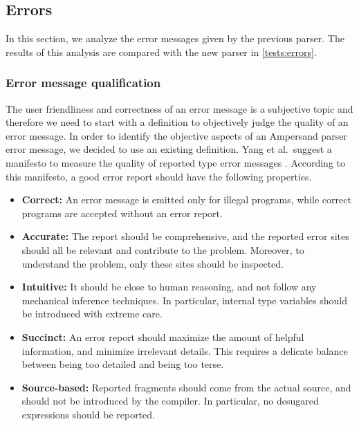 
\subsection{Errors}
\label{analysis:errors}
In this section, we analyze the error messages given by the previous parser.
The results of this analysis are compared with the new parser in \autoref{tests:errors}.

\subsubsection{Error message qualification}
The user friendliness and correctness of an error message is a subjective topic and therefore we need to start with a definition to objectively judge the quality of an error message.
In order to identify the objective aspects of an Ampersand parser error message, we decided to use an existing definition.
Yang et al.~suggest a manifesto to measure the quality of reported type error messages .
According to this manifesto, a good error report should have the following properties.
\begin{itemize}
  \item \textbf{Correct:} An error message is emitted only for illegal programs, while correct programs are accepted without an error report.
  \item \textbf{Accurate:} The report should be comprehensive, and the reported error sites should all be relevant and contribute to the problem. Moreover, to understand the problem, only these sites should be inspected.
  \item \textbf{Intuitive:} It should be close to human reasoning, and not follow any mechanical inference techniques. In particular, internal type variables should be introduced with extreme care.
  \item \textbf{Succinct:} An error report should maximize the amount of helpful information, and minimize irrelevant details. This requires a delicate balance between being too detailed and being too terse.
  \item \textbf{Source-based:} Reported fragments should come from the actual source, and should not be introduced by the compiler. In particular, no desugared expressions should be reported.
\end{itemize}

